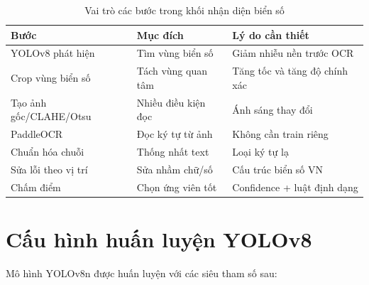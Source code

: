 \documentclass[a4paper,14pt]{extreport}
\begin{document}
\begin{table}[H]
\centering
\caption{Vai trò các bước trong khối nhận diện biển số}
\label{tab:vai_tro_nhan_dien}
\begin{tabular}{p{3.5cm} p{4cm} p{5cm}}
\toprule
\textbf{Bước} & \textbf{Mục đích} & \textbf{Lý do cần thiết} \\
\midrule
YOLOv8 phát hiện & Tìm vùng biển số & Giảm nhiễu nền trước OCR \\
Crop vùng biển số & Tách vùng quan tâm & Tăng tốc và tăng độ chính xác \\
Tạo ảnh gốc/CLAHE/Otsu & Nhiều điều kiện đọc & Ánh sáng thay đổi \\
PaddleOCR & Đọc ký tự từ ảnh & Không cần train riêng \\
Chuẩn hóa chuỗi & Thống nhất text & Loại ký tự lạ \\
Sửa lỗi theo vị trí & Sửa nhầm chữ/số & Cấu trúc biển số VN \\
Chấm điểm & Chọn ứng viên tốt & Confidence + luật định dạng \\
\bottomrule
\end{tabular}
\end{table}

\section{Cấu hình huấn luyện YOLOv8}

Mô hình YOLOv8n được huấn luyện với các siêu tham số sau:
\end{document}
